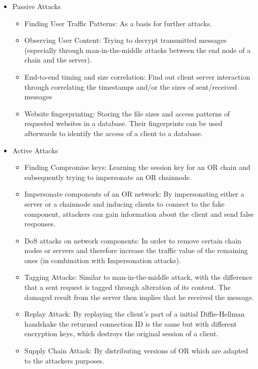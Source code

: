 \documentclass{sig-alternate}
\begin{document}
\begin{description} 
	\begin{itemize} \itemsep0pt 
		\item Passive Attacks
		\begin{itemize} \itemsep0pt 
			\item Finding User Traffic Patterns: As a basis for further attacks.
			\item Observing User Content: Trying to decrypt transmitted messages (especially through man-in-the-middle attacks between the end node of a chain and the server).
			\item End-to-end timing and size correlation: Find out client server interaction through correlating the timestamps and/or the sizes of sent/received messages 
			\item Website fingerprinting: Storing the file sizes and access patterns of requested websites in a database. Their fingerprints can be used afterwards to identify the access of a client to a database\cite{panchenko2011website}.
		\end{itemize}
		\item Active Attacks
		\begin{itemize} \itemsep0pt 
			\item Finding Compromise keys: Learning the session key for an OR chain and subsequently trying to impersonate an OR chainnode.
			\item Impersonate components of an OR network: By impersonating either a server or a chainnode and inducing clients to connect to the fake component, attackers can gain information about the client and send false responses.
			\item DoS attacks on network components: In order to remove certain chain nodes or servers and therefore increase the traffic value of the remaining ones (in combination with Impersonation attacks).
			\item Tagging Attacks: Similar to man-in-the-middle attack, with the difference that a sent request is tagged through alteration of its content. The damaged result from the server then implies that he received the message. 
			\item Replay Attack: By replaying the client's part of a initial Diffie-Hellman handshake the returned connection ID is the same but with different encryption keys, which destroys the original session of a client.
			\item Supply Chain Attack: By distributing versions of OR which are adapted to the attackers purposes. 

\end{itemize}
\end{itemize}
\end{description}
\end{document}
